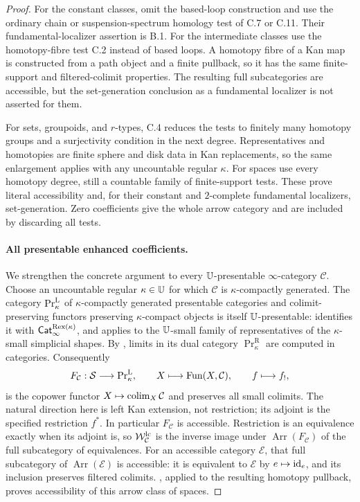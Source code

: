 \begin{proof}
For the constant classes, omit the based-loop construction and
use the ordinary chain or suspension-spectrum homology test
of C.7 or C.11. Their fundamental-localizer assertion is B.1.
For the intermediate classes use the homotopy-fibre test C.2
instead of based loops. A homotopy fibre of a Kan map is
constructed from a path object and a finite pullback, so it
has the same finite-support and filtered-colimit properties.
The resulting full subcategories are accessible, but the
set-generation conclusion as a fundamental localizer is not
asserted for them.

For sets, groupoids, and $r$-types, C.4 reduces the tests to
finitely many homotopy groups and a surjectivity condition
in the next degree. Representatives and homotopies are finite
sphere and disk data in Kan replacements, so the same
enlargement applies with any uncountable regular $\kappa$.
For spaces use every homotopy degree, still a countable family
of finite-support tests. These prove literal accessibility
and, for their constant and $2$-complete fundamental
localizers, set-generation. Zero coefficients give the whole
arrow category and are included by discarding all tests.
\paragraph{All presentable enhanced coefficients.}
We strengthen the concrete argument to every $\mathbb U$-presentable
$\infty$-category $\mathcal C$. Choose an uncountable regular
$\kappa\in\mathbb U$ for which $\mathcal C$ is
$\kappa$-compactly generated. The category $\mathrm{Pr}^{\mathrm L}_\kappa$ of
$\kappa$-compactly generated presentable categories and
colimit-preserving functors preserving $\kappa$-compact objects
is itself $\mathbb U$-presentable:
\citet[Proposition~5.5.7.10]{EF_LurieHTT} identifies it with
$\mathsf{Cat}_\infty^{\mathrm{Rex}(\kappa)}$, and
\citet[Lemma~4.8.4.2]{EF_LurieHA} applies to the
$\mathbb U$-small family of representatives of the $\kappa$-small simplicial shapes.
By \citet[Proposition~5.5.7.6 and Notation~5.5.7.7]{EF_LurieHTT},
limits in its dual category $\operatorname{Pr}^{\mathrm R}_\kappa$ are
computed in categories. Consequently
\[
 F_{\mathcal C}:\mathcal S\longrightarrow\mathrm{Pr}^{\mathrm L}_\kappa,
 \qquad X\longmapsto\operatorname{Fun}(X,\mathcal C),\qquad f\longmapsto f_!,
\]
is the copower functor $X\mapsto\operatorname*{colim}_X\mathcal C$ and
preserves all small colimits. The natural direction here is
left Kan extension, not restriction; its adjoint is the
specified restriction $f^*$. In particular $F_{\mathcal C}$
is accessible. Restriction is an equivalence exactly when
its adjoint is, so $\mathcal W^{\mathrm{lc}}_{\mathcal C}$ is the
inverse image under $\operatorname{Arr}(F_{\mathcal C})$
of the full subcategory of equivalences. For an accessible
category $\mathcal E$, that full subcategory of
$\operatorname{Arr}(\mathcal E)$ is accessible: it is
equivalent to $\mathcal E$ by $e\mapsto\mathrm{id}_e$, and its
inclusion preserves filtered colimits.
\citet[Proposition~5.4.6.6]{EF_LurieHTT}, applied to the
resulting homotopy pullback, proves accessibility of this
arrow class of spaces.


\end{proof}
